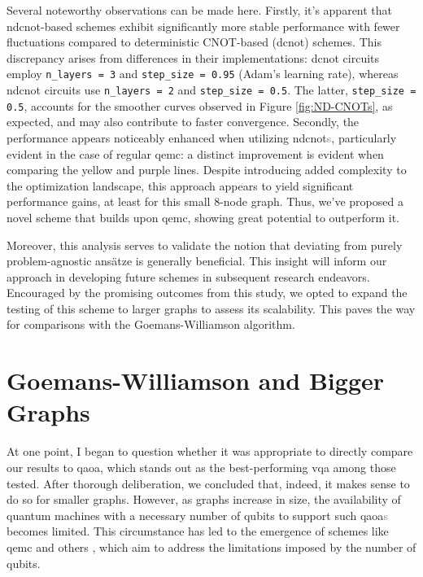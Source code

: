 Several noteworthy observations can be made here. Firstly, it's apparent that \acrshort{ndcnot}-based schemes exhibit significantly more stable performance with fewer fluctuations compared to deterministic CNOT-based (\acrshort{dcnot}) schemes. This discrepancy arises from differences in their implementations: \acrshort{dcnot} circuits employ \texttt{n\_layers = 3} and \texttt{step\_size = 0.95} (Adam's learning rate), whereas \acrshort{ndcnot} circuits use \texttt{n\_layers = 2} and \texttt{step\_size = 0.5}. The latter, \texttt{step\_size = 0.5}, accounts for the smoother curves observed in Figure \ref{fig:ND-CNOTs}, as expected, and may also contribute to faster convergence. Secondly, the performance appears noticeably enhanced when utilizing \acrshort{ndcnot}\textcolor{gray}{s}, particularly evident in the case of regular \acrshort{qemc}: a distinct improvement is evident when comparing the yellow and purple lines. Despite introducing added complexity to the optimization landscape, this approach appears to yield significant performance gains, at least for this small $8$-node graph. Thus, we've proposed a novel scheme that builds upon \acrshort{qemc}, showing great potential to outperform it.

Moreover, this analysis serves to validate the notion that deviating from purely problem-agnostic ansätze is generally beneficial. This insight will inform our approach in developing future schemes in subsequent research endeavors. Encouraged by the promising outcomes from this study, we opted to expand the testing of this scheme to larger graphs to assess its scalability. This paves the way for comparisons with the Goemans-Williamson algorithm.





\vspace{-2.5mm}
\section{Goemans-Williamson and Bigger Graphs}
\label{section:GW_Bigger_Graphs}


At one point, I began to question whether it was appropriate to directly compare our results to \acrshort{qaoa}, which stands out as the best-performing \acrshort{vqa} among those tested. After thorough deliberation, we concluded that, indeed, it makes sense to do so for smaller graphs. However, as graphs increase in size, the availability of quantum machines with a necessary number of qubits to support such \acrshort{qaoa}\textcolor{gray}{s} becomes limited. This circumstance has led to the emergence of schemes like \acrshort{qemc} \cite{tenecohen2023variational} and others \cite{sciorilli2024largescale}, which aim to address the limitations imposed by the number of qubits.

